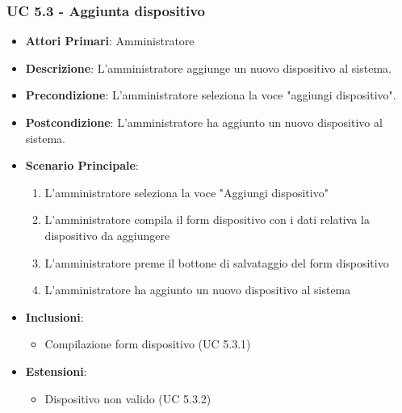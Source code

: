 			\subsubsection{UC 5.3 - Aggiunta dispositivo}
			\begin{itemize}
				\item \textbf{Attori Primari}: Amministratore
				\item \textbf{Descrizione}: L'amministratore aggiunge un nuovo dispositivo al sistema.
				\item \textbf{Precondizione}: L'amministratore seleziona la voce "aggiungi dispositivo".
				\item \textbf{Postcondizione}: L'amministratore ha aggiunto un nuovo dispositivo al sistema.
				\item \textbf{Scenario Principale}:
				\begin{enumerate}
					\item{L'amministratore seleziona la voce "Aggiungi dispositivo"}
					\item{L'amministratore compila il form dispositivo con i dati relativa la dispositivo da aggiungere}
					\item{L'amministratore preme il bottone di salvataggio del form dispositivo}
					\item{L'amministratore ha aggiunto un nuovo dispositivo al sistema}
				\end{enumerate}
				\item \textbf{Inclusioni}:
				\begin{itemize}
					\item Compilazione form dispositivo (UC 5.3.1)
				\end{itemize}
				\item \textbf{Estensioni}:
				\begin{itemize}
					\item Dispositivo non valido (UC 5.3.2)
				\end{itemize}
			\end{itemize}
			
